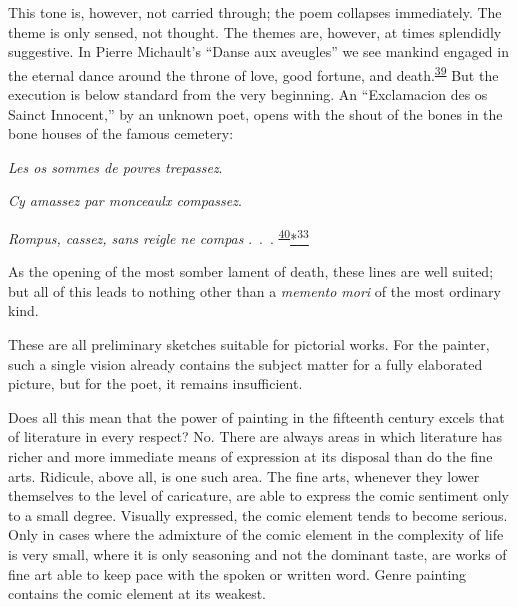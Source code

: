\protect\hypertarget{21_Chapter_Thirteen__IMAGE_AND_WORD.xhtmlux5cux23page_361}{}{}This
tone is, however, not carried through; the poem collapses immediately.
The theme is only sensed, not thought. The themes are, however, at times
splendidly suggestive. In Pierre Michault's ``Danse aux aveugles'' we
see mankind engaged in the eternal dance around the throne of love, good
fortune, and
death.\textsuperscript{\protect\hypertarget{21_Chapter_Thirteen__IMAGE_AND_WORD.xhtmlux5cux23id_233}{\protect\hyperlink{23_NOTES.xhtmlux5cux23id_234}{39}}}
But the execution is below standard from the very beginning. An
``Exclamacion des os Sainct Innocent,'' by an unknown poet, opens with
the shout of the bones in the bone houses of the famous cemetery:

\emph{Les os sommes de povres trepassez}.

\emph{Cy amassez par monceaulx compassez}.

\emph{Rompus, cassez, sans reigle ne compas} .~.~.
\textsuperscript{\protect\hypertarget{21_Chapter_Thirteen__IMAGE_AND_WORD.xhtmlux5cux23id_231}{\protect\hyperlink{23_NOTES.xhtmlux5cux23id_232}{40}}}\protect\hypertarget{21_Chapter_Thirteen__IMAGE_AND_WORD.xhtmlux5cux23id_2759}{\protect\hyperlink{23_NOTES.xhtmlux5cux23id_2760}{*\textsuperscript{33}}}

As the opening of the most somber lament of death, these lines are well
suited; but all of this leads to nothing other than a \emph{memento
mori} of the most ordinary kind.

These are all preliminary sketches suitable for pictorial works. For the
painter, such a single vision already contains the subject matter for a
fully elaborated picture, but for the poet, it remains insufficient.

Does all this mean that the power of painting in the fifteenth century
excels that of literature in every respect? No. There are always areas
in which literature has richer and more immediate means of expression at
its disposal than do the fine arts. Ridicule, above all, is one such
area. The fine arts, whenever they lower themselves to the level of
caricature, are able to express the comic sentiment only to a small
degree. Visually expressed, the comic element tends to become serious.
Only in cases where the admixture of the comic element in the complexity
of life is very small, where it is only seasoning and not the dominant
taste, are works of fine art able to keep pace with the spoken or
written word. Genre painting contains the comic element at its weakest.

